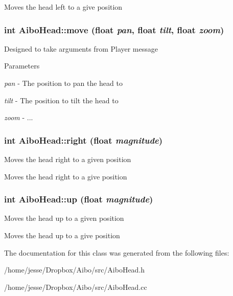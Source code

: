 Moves the head left to a give position \hypertarget{classAiboHead_adf0f91fafeaa5e32b5e387ac136e0f37}{
\subsubsection[{move}]{\setlength{\rightskip}{0pt plus 5cm}int AiboHead::move (float {\em pan}, \/  float {\em tilt}, \/  float {\em zoom})}}
\label{classAiboHead_adf0f91fafeaa5e32b5e387ac136e0f37}
Designed to take arguments from Player message 
\begin{DoxyParams}{Parameters}
\item[{\em pan}]-\/ The position to pan the head to \item[{\em tilt}]-\/ The position to tilt the head to \item[{\em zoom}]-\/ ... \end{DoxyParams}
\hypertarget{classAiboHead_a6be7b6743be53896c2f41dc1db1ce2a5}{
\subsubsection[{right}]{\setlength{\rightskip}{0pt plus 5cm}int AiboHead::right (float {\em magnitude})}}
\label{classAiboHead_a6be7b6743be53896c2f41dc1db1ce2a5}
Moves the head right to a given position

Moves the head right to a give position \hypertarget{classAiboHead_a085f54c6374d5eb117c12b0e9cad2d0e}{
\subsubsection[{up}]{\setlength{\rightskip}{0pt plus 5cm}int AiboHead::up (float {\em magnitude})}}
\label{classAiboHead_a085f54c6374d5eb117c12b0e9cad2d0e}
Moves the head up to a given position

Moves the head up to a give position 

The documentation for this class was generated from the following files:\begin{DoxyCompactItemize}
\item 
/home/jesse/Dropbox/Aibo/src/AiboHead.h\item 
/home/jesse/Dropbox/Aibo/src/AiboHead.cc\end{DoxyCompactItemize}

